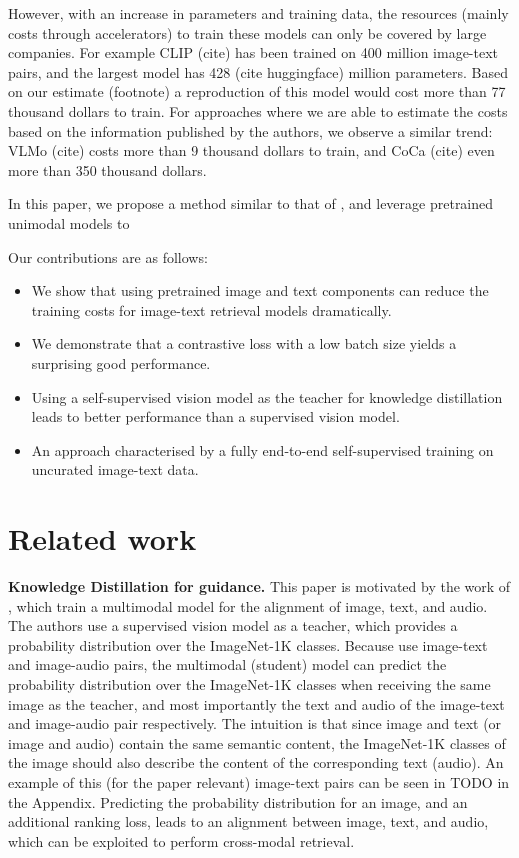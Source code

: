 \documentclass[10pt]{article} %
\begin{document}
However, with an increase in parameters and training data, the resources (mainly costs through accelerators) to train these models can only be covered by large companies. For example CLIP (cite) has been trained on 400 million image-text pairs, and the largest model has 428 (cite huggingface) million parameters. Based on our estimate (footnote) a reproduction of this model would cost more than 77 thousand dollars to train. For approaches where we are able to estimate the costs based on the information published by the authors, we observe a similar trend: VLMo (cite) costs more than 9 thousand dollars to train, and CoCa (cite) even more than 350 thousand dollars.

In this paper, we propose a method similar to that of \citet{shre}, and leverage pretrained unimodal models to 

Our contributions are as follows:
\begin{itemize}
\item We show that using pretrained image and text components can reduce the training costs for image-text retrieval models dramatically.
\item We demonstrate that a contrastive loss with a low batch size yields a surprising good performance.
\item Using a self-supervised vision model as the teacher for knowledge distillation leads to better performance than a supervised vision model.
\item An approach characterised by a fully end-to-end self-supervised training on uncurated image-text data.
\end{itemize}

\section{Related work}

\textbf{Knowledge Distillation for guidance.} This paper is motivated by the work of \citet{shre}, which train a multimodal model for the alignment of image, text, and audio. The authors use a supervised vision model as a teacher, which provides a probability distribution over the ImageNet-1K \citep{imagenet} classes. Because \citet{shre} use image-text and image-audio pairs, the multimodal (student) model can predict the probability distribution over the ImageNet-1K \citep{imagenet} classes when receiving the same image as the teacher, and most importantly the text and audio of the image-text and image-audio pair respectively. The intuition is that since image and text (or image and audio) contain the same semantic content, the ImageNet-1K \citep{imagenet} classes of the image should also describe the content of the corresponding text (audio). An example of this (for the paper relevant) image-text pairs can be seen in TODO in the Appendix. Predicting the probability distribution for an image, and an additional ranking loss, leads to an alignment between image, text, and audio, which can be exploited to perform cross-modal retrieval.
\end{document}
